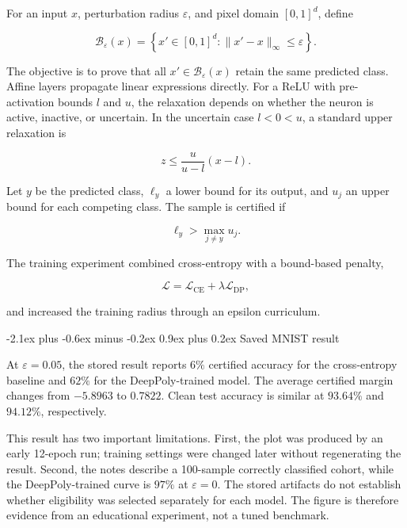 \documentclass[11pt,a4paper]{article}
\makeatletter
\renewcommand\subsection{\@startsection{subsection}{2}{0pt}
  {-2.1ex plus -0.6ex minus -0.2ex}
  {0.9ex plus 0.2ex}
  {\normalfont\normalsize\bfseries\color{researchnavy}}}
\makeatother
\begin{document}
For an input \(x\), perturbation radius \(\varepsilon\), and pixel domain \([0,1]^d\), define

\begin{equation}
\mathcal{B}_{\varepsilon}(x)
=
\left\{
x' \in [0,1]^d :
\lVert x' - x \rVert_{\infty} \leq \varepsilon
\right\}.
\label{eq:ball}
\end{equation}

The objective is to prove that all \(x'\in\mathcal{B}_{\varepsilon}(x)\) retain the same predicted class. Affine layers propagate linear expressions directly. For a ReLU with pre-activation bounds \(l\) and \(u\), the relaxation depends on whether the neuron is active, inactive, or uncertain. In the uncertain case \(l<0<u\), a standard upper relaxation is

\begin{equation}
z \leq \frac{u}{u-l}(x-l).
\label{eq:relu}
\end{equation}

Let \(y\) be the predicted class, \(\ell_y\) a lower bound for its output, and \(u_j\) an upper bound for each competing class. The sample is certified if

\begin{equation}
\ell_y > \max_{j\neq y} u_j.
\label{eq:cert}
\end{equation}

The training experiment combined cross-entropy with a bound-based penalty,

\begin{equation}
\mathcal{L}
=
\mathcal{L}_{\mathrm{CE}}
+
\lambda\mathcal{L}_{\mathrm{DP}},
\label{eq:dp-loss}
\end{equation}

and increased the training radius through an epsilon curriculum.

\subsection{Saved MNIST result}

At \(\varepsilon=0.05\), the stored result reports \(6\%\) certified accuracy for the cross-entropy baseline and \(62\%\) for the DeepPoly-trained model. The average certified margin changes from \(-5.8963\) to \(0.7822\). Clean test accuracy is similar at \(93.64\%\) and \(94.12\%\), respectively.

This result has two important limitations. First, the plot was produced by an early 12-epoch run; training settings were changed later without regenerating the result. Second, the notes describe a 100-sample correctly classified cohort, while the DeepPoly-trained curve is \(97\%\) at \(\varepsilon=0\). The stored artifacts do not establish whether eligibility was selected separately for each model. The figure is therefore evidence from an educational experiment, not a tuned benchmark.
\end{document}
